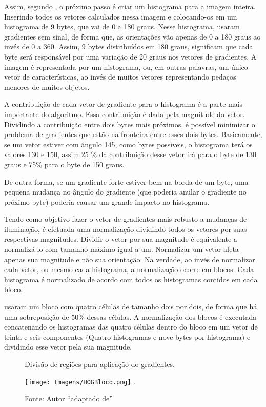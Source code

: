 Assim, segundo , o próximo passo é criar um histograma para a imagem inteira. Inserindo todos os vetores calculados nessa imagem e colocando-os em um histograma de 9 bytes, que vai de 0 a 180 graus. Nesse histograma,  usaram gradientes sem sinal, de forma que, as orientações vão apenas de 0 a 180 graus ao invés de 0 a 360. Assim, 9 bytes distribuídos em 180 graus, significam que cada byte será responsável por uma variação de 20 graus nos vetores de gradientes. A imagem é representada por um histograma, ou, em outras palavras, um único vetor de características, ao invés de muitos vetores representando pedaços menores de muitos objetos. 

A contribuição de cada vetor de gradiente para o histograma é a parte mais importante do algoritmo. Essa contribuição é dada pela magnitude do vetor. Dividindo a contribuição entre dois bytes mais próximos, é possível minimizar o problema de gradientes que estão na fronteira entre esses dois bytes. Basicamente, se um vetor estiver com ângulo 145, como bytes possíveis, o histograma terá os valores 130 e 150, assim 25 \% da contribuição desse vetor irá para o byte de 130 graus e 75\% para o byte de 150 graus.

De outra forma, se um gradiente forte estiver bem na borda de um byte, uma pequena mudança no ângulo do gradiente (que poderia anular o gradiente no próximo byte) poderia causar um grande impacto no histograma. 

Tendo como objetivo fazer o vetor de gradientes mais robusto a mudanças de iluminação, é efetuada uma normalização dividindo todos os vetores por suas respectivas magnitudes. Dividir o vetor por sua magnitude é equivalente a normalizá-lo com tamanho máximo igual a um. Normalizar um vetor afeta apenas sua magnitude e não sua orientação.
Na verdade, ao invés de normalizar cada vetor, ou mesmo cada histograma, a normalização ocorre em blocos. Cada histograma é normalizado de acordo com todos os histogramas contidos em cada bloco.

 usaram um bloco com quatro células de tamanho dois por dois, de forma que há uma sobreposição de 50\% dessas células. A normalização dos blocos é executada concatenando os histogramas das quatro células dentro do bloco em um vetor de trinta e seis componentes (Quatro histogramas e nove bytes por histograma) e dividindo esse vetor pela sua magnitude.

\begin{figure}[!h!]
\centering \caption{Divisão de regiões para aplicação do gradientes.}
\texttt{[image: Imagens/HOGBloco.png]}
\DeclareGraphicsExtensions.
\caption*{Fonte: Autor ``adaptado de'' }
\label{Fig:HogBloco}
\end{figure}


